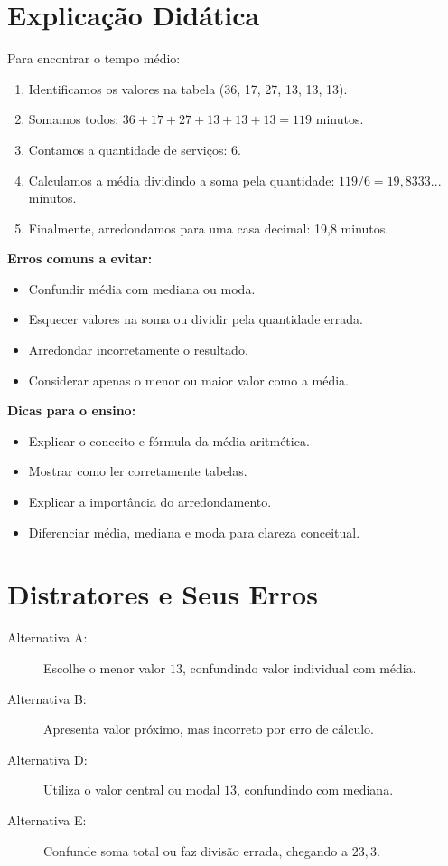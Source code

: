 \documentclass{article}
\begin{document}
\section*{Explicação Didática}

Para encontrar o tempo médio:
\begin{enumerate}
  \item Identificamos os valores na tabela (36, 17, 27, 13, 13, 13). 
  \item Somamos todos: $36+17+27+13+13+13 = 119$ minutos.
  \item Contamos a quantidade de serviços: 6.
  \item Calculamos a média dividindo a soma pela quantidade: $119/6 = 19,8333...$ minutos.
  \item Finalmente, arredondamos para uma casa decimal: 19,8 minutos.
\end{enumerate}

\textbf{Erros comuns a evitar:}
\begin{itemize}
  \item Confundir média com mediana ou moda.
  \item Esquecer valores na soma ou dividir pela quantidade errada.
  \item Arredondar incorretamente o resultado.
  \item Considerar apenas o menor ou maior valor como a média.
\end{itemize}

\textbf{Dicas para o ensino:}
\begin{itemize}
  \item Explicar o conceito e fórmula da média aritmética.
  \item Mostrar como ler corretamente tabelas.
  \item Explicar a importância do arredondamento.
  \item Diferenciar média, mediana e moda para clareza conceitual.
\end{itemize}

\section*{Distratores e Seus Erros}
\begin{description}
\item[Alternativa A:] Escolhe o menor valor $\boxed{13}$, confundindo valor individual com média.
\item[Alternativa B:] Apresenta valor próximo, mas incorreto por erro de cálculo.
\item[Alternativa D:] Utiliza o valor central ou modal $13$, confundindo com mediana.
\item[Alternativa E:] Confunde soma total ou faz divisão errada, chegando a $23,3$.
\end{description}
\end{document}
